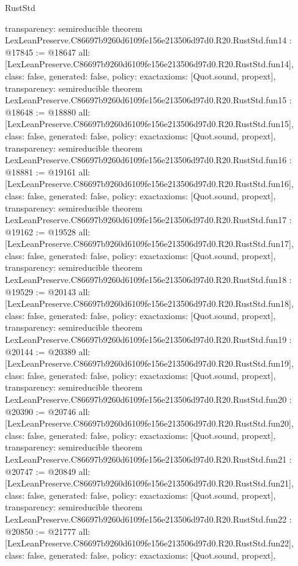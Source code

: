 \begin{lexlean}{RustStd}
\begin{coremodule}
{  transparency: semireducible
}
theorem LexLeanPreserve.C86697b9260d6109fe156e213506d97d0.R20.RustStd.fun14 : @17845 := @18647 {
  all: [LexLeanPreserve.C86697b9260d6109fe156e213506d97d0.R20.RustStd.fun14],
  class: false,
  generated: false,
  policy: exact{axioms: [Quot.sound, propext]},
  transparency: semireducible
}
theorem LexLeanPreserve.C86697b9260d6109fe156e213506d97d0.R20.RustStd.fun15 : @18648 := @18880 {
  all: [LexLeanPreserve.C86697b9260d6109fe156e213506d97d0.R20.RustStd.fun15],
  class: false,
  generated: false,
  policy: exact{axioms: [Quot.sound, propext]},
  transparency: semireducible
}
theorem LexLeanPreserve.C86697b9260d6109fe156e213506d97d0.R20.RustStd.fun16 : @18881 := @19161 {
  all: [LexLeanPreserve.C86697b9260d6109fe156e213506d97d0.R20.RustStd.fun16],
  class: false,
  generated: false,
  policy: exact{axioms: [Quot.sound, propext]},
  transparency: semireducible
}
theorem LexLeanPreserve.C86697b9260d6109fe156e213506d97d0.R20.RustStd.fun17 : @19162 := @19528 {
  all: [LexLeanPreserve.C86697b9260d6109fe156e213506d97d0.R20.RustStd.fun17],
  class: false,
  generated: false,
  policy: exact{axioms: [Quot.sound, propext]},
  transparency: semireducible
}
theorem LexLeanPreserve.C86697b9260d6109fe156e213506d97d0.R20.RustStd.fun18 : @19529 := @20143 {
  all: [LexLeanPreserve.C86697b9260d6109fe156e213506d97d0.R20.RustStd.fun18],
  class: false,
  generated: false,
  policy: exact{axioms: [Quot.sound, propext]},
  transparency: semireducible
}
theorem LexLeanPreserve.C86697b9260d6109fe156e213506d97d0.R20.RustStd.fun19 : @20144 := @20389 {
  all: [LexLeanPreserve.C86697b9260d6109fe156e213506d97d0.R20.RustStd.fun19],
  class: false,
  generated: false,
  policy: exact{axioms: [Quot.sound, propext]},
  transparency: semireducible
}
theorem LexLeanPreserve.C86697b9260d6109fe156e213506d97d0.R20.RustStd.fun20 : @20390 := @20746 {
  all: [LexLeanPreserve.C86697b9260d6109fe156e213506d97d0.R20.RustStd.fun20],
  class: false,
  generated: false,
  policy: exact{axioms: [Quot.sound, propext]},
  transparency: semireducible
}
theorem LexLeanPreserve.C86697b9260d6109fe156e213506d97d0.R20.RustStd.fun21 : @20747 := @20849 {
  all: [LexLeanPreserve.C86697b9260d6109fe156e213506d97d0.R20.RustStd.fun21],
  class: false,
  generated: false,
  policy: exact{axioms: [Quot.sound, propext]},
  transparency: semireducible
}
theorem LexLeanPreserve.C86697b9260d6109fe156e213506d97d0.R20.RustStd.fun22 : @20850 := @21777 {
  all: [LexLeanPreserve.C86697b9260d6109fe156e213506d97d0.R20.RustStd.fun22],
  class: false,
  generated: false,
  policy: exact{axioms: [Quot.sound, propext]},
}
\end{coremodule}
\end{lexlean}
